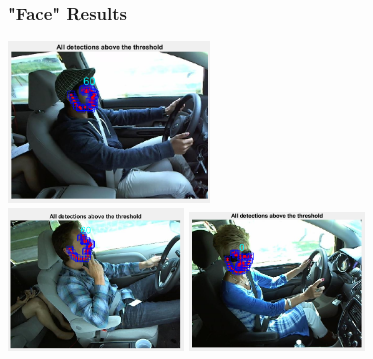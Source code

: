 \documentclass{beamer}
\begin{document}
	\begin{frame}
		\frametitle{"Face" Results}
		\begin{center}
			\includegraphics[width=0.4\textwidth]{faces/face1} \\ \vspace{0.1cm}
			\includegraphics[width=0.35\textwidth]{faces/face4} \hspace{0.1cm}
			\includegraphics[width=0.35\textwidth]{faces/face6}
		\end{center}		
	\end{frame}
\end{document}
